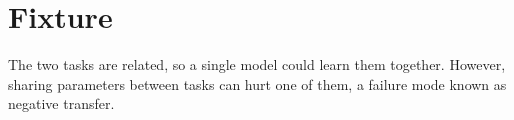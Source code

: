 \section{Fixture}
The two tasks are related, so a single model could learn them together.
However, sharing parameters between tasks can hurt one of them, a failure mode known as
negative transfer.
